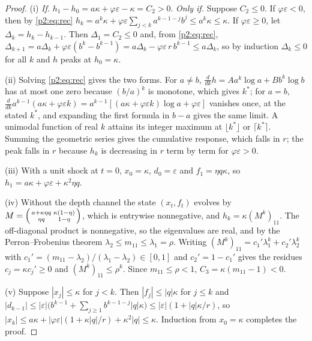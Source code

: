 \begin{proof}
(i) \emph{If.} $h_1-h_0=a\kappa+\varphi\varepsilon-\kappa=C_2>0$. \emph{Only if.} Suppose $C_2\le0$. If $\varphi\varepsilon<0$, then by \eqref{p2:eq:rec} $h_k=a^k\kappa+\varphi\varepsilon\sum_{j<k}a^{k-1-j}b^j\le a^k\kappa\le\kappa$. If $\varphi\varepsilon\ge0$, let $\Delta_k=h_k-h_{k-1}$. Then $\Delta_1=C_2\le0$ and, from \eqref{p2:eq:rec}, $\Delta_{k+1}=a\Delta_k+\varphi\varepsilon(b^{k}-b^{k-1})=a\Delta_k-\varphi\varepsilon\,r\,b^{k-1}\le a\Delta_k$, so by induction $\Delta_k\le0$ for all $k$ and $h$ peaks at $h_0=\kappa$.

(ii) Solving \eqref{p2:eq:rec} gives the two forms. For $a\ne b$, $\frac{d}{dk}h=Aa^k\log a+Bb^k\log b$ has at most one zero because $(b/a)^k$ is monotone, which gives $k^*$; for $a=b$, $\frac{d}{dk}a^{k-1}(a\kappa+\varphi\varepsilon k)=a^{k-1}[(a\kappa+\varphi\varepsilon k)\log a+\varphi\varepsilon]$ vanishes once, at the stated $k^*$, and expanding the first formula in $b-a$ gives the same limit. A unimodal function of real $k$ attains its integer maximum at $\lfloor k^*\rfloor$ or $\lceil k^*\rceil$. Summing the geometric series gives the cumulative response, which falls in $r$; the peak falls in $r$ because $h_k$ is decreasing in $r$ term by term for $\varphi\varepsilon>0$.

(iii) With a unit shock at $t=0$, $x_0=\kappa$, $d_0=\varepsilon$ and $f_1=\eta q\kappa$, so $h_1=a\kappa+\varphi\varepsilon+\kappa^2\eta q$.

(iv) Without the depth channel the state $(x_t,f_t)$ evolves by $M=\begin{psmallmatrix}a+\kappa\eta q&\kappa(1-\eta)\\ \eta q&1-\eta\end{psmallmatrix}$, which is entrywise nonnegative, and $h_k=\kappa(M^k)_{11}$. The off-diagonal product is nonnegative, so the eigenvalues are real, and by the Perron--Frobenius theorem $\lambda_2\le m_{11}\le\lambda_1=\rho$. Writing $(M^k)_{11}=c_1'\lambda_1^k+c_2'\lambda_2^k$ with $c_1'=(m_{11}-\lambda_2)/(\lambda_1-\lambda_2)\in[0,1]$ and $c_2'=1-c_1'$ gives the residues $c_j=\kappa c_j'\ge0$ and $(M^k)_{11}\le\rho^k$. Since $m_{11}\le\rho<1$, $C_3=\kappa(m_{11}-1)<0$.

(v) Suppose $|x_j|\le\kappa$ for $j<k$. Then $|f_j|\le|q|\kappa$ for $j\le k$ and $|d_{k-1}|\le|\varepsilon|\bigl(b^{k-1}+\sum_{j\ge1}b^{k-1-j}|q|\kappa\bigr)\le|\varepsilon|(1+|q|\kappa/r)$, so $|x_k|\le a\kappa+|\varphi\varepsilon|(1+\kappa|q|/r)+\kappa^2|q|\le\kappa$. Induction from $x_0=\kappa$ completes the proof.
\end{proof}

